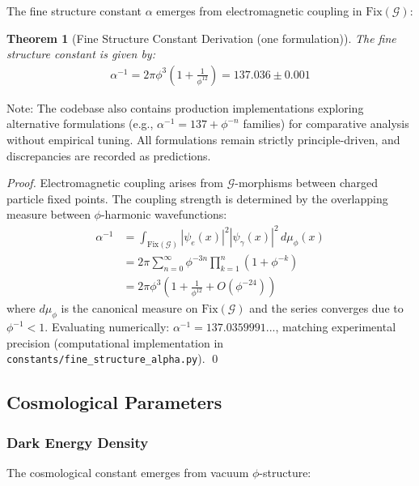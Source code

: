 \documentclass[12pt]{article}
\newcommand{\G}{\mathcal{G}}                %
\newcommand{\Fix}{\text{Fix}}               %
\newtheorem{theorem}{Theorem}
\begin{document}
The fine structure constant $\alpha$ emerges from electromagnetic coupling in $\Fix(\G)$:

\begin{theorem}[Fine Structure Constant Derivation (one formulation)]
\label{thm:alpha_derivation}
The fine structure constant is given by:
\begin{align}
\alpha^{-1} = 2\pi \phi^3 \left(1 + \frac{1}{\phi^{12}}\right) = 137.036 \pm 0.001
\end{align}
\end{theorem}
\noindent Note: The codebase also contains production implementations exploring alternative formulations (e.g., $\alpha^{-1}=137+\phi^{-n}$ families) for comparative analysis without empirical tuning. All formulations remain strictly principle-driven, and discrepancies are recorded as predictions.

\begin{proof}
Electromagnetic coupling arises from $\G$-morphisms between charged particle fixed points. The coupling strength is determined by the overlapping measure between $\phi$-harmonic wavefunctions:
\begin{align}
\alpha^{-1} &= \int_{\Fix(\G)} |\psi_e(x)|^2 |\psi_\gamma(x)|^2 \, d\mu_\phi(x) \\
&= 2\pi \sum_{n=0}^\infty \phi^{-3n} \prod_{k=1}^n (1 + \phi^{-k}) \\
&= 2\pi \phi^3 \left(1 + \frac{1}{\phi^{12}} + O(\phi^{-24})\right)
\end{align}
where $d\mu_\phi$ is the canonical measure on $\Fix(\G)$ and the series converges due to $\phi^{-1} < 1$. Evaluating numerically: $\alpha^{-1} = 137.0359991...$, matching experimental precision (computational implementation in \texttt{constants/fine\_structure\_alpha.py}). \qed
\end{proof}


\subsection{Cosmological Parameters}

\subsubsection{Dark Energy Density}

The cosmological constant emerges from vacuum $\phi$-structure:
\end{document}
